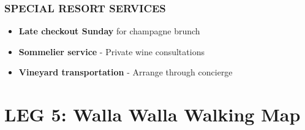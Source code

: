 \documentclass[
  10pt,
]{article}
\providecommand{\tightlist}{%
  \setlength{\itemsep}{0pt}\setlength{\parskip}{0pt}}
\begin{document}
\subsubsection{\texorpdfstring{\textcolor{primary}{SPECIAL RESORT SERVICES}}{}}\label{section-37}

\begin{itemize}
\tightlist
\item
  \textbf{\textcolor{secondary}{Late checkout Sunday}} for champagne
  brunch
\item
  \textbf{\textcolor{secondary}{Sommelier service}} - Private wine
  consultations\\
\item
  \textbf{\textcolor{secondary}{Vineyard transportation}} - Arrange
  through concierge
\end{itemize}

\newpage

\section{\texorpdfstring{\textcolor{primary}{LEG 5: Walla Walla Walking Map}}{}}\label{section-38}
\end{document}
